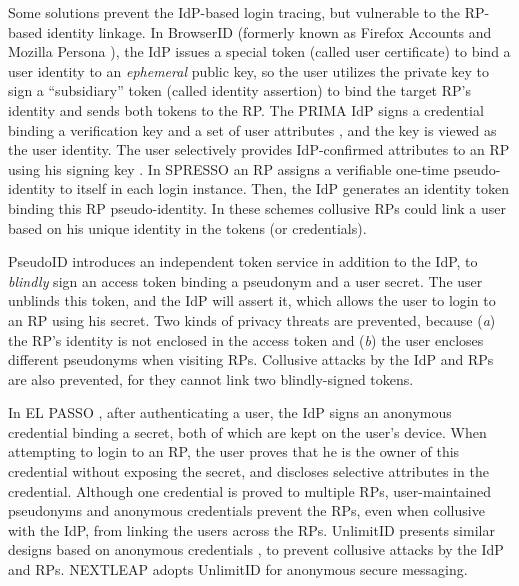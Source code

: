 Some solutions prevent the IdP-based login tracing,
    but vulnerable to the RP-based identity linkage.
In BrowserID \cite{BrowserID} (formerly known as Firefox Accounts \cite{FirefoxAccount} and Mozilla Persona \cite{persona}),
 the IdP %
  issues a special token (called user certificate) to bind a user identity to an \emph{ephemeral} public key,
 so the user utilizes the private key to sign a ``subsidiary'' token (called identity assertion)
    to bind the target RP's identity and sends both tokens to the RP.
The PRIMA IdP signs a credential binding a verification key and a set of user attributes \cite{prima}, and the key is viewed as the user identity.
The user selectively provides IdP-confirmed attributes to an RP using his signing key \cite{Oblivion}. %
In SPRESSO \cite{SPRESSO} an RP assigns a verifiable one-time pseudo-identity to itself in each login instance.
Then, the IdP generates an identity token binding this RP pseudo-identity. %
In these schemes \cite{BrowserID,prima,SPRESSO}
    collusive RPs could link a user based on his unique identity in the tokens (or credentials).

PseudoID \cite{PseudoID} introduces an independent token service in addition to the IdP,
    to  \emph{blindly} sign an access token binding a pseudonym and a user secret.
The user unblinds this token,
 and the IdP will assert it,
    which allows the user to login to an RP using his secret.
Two kinds of privacy threats are prevented, because (\emph{a}) the RP's identity is not enclosed in the access token
    and (\emph{b}) the user encloses different pseudonyms when visiting RPs.
Collusive attacks by the IdP and RPs are also prevented,
    for they cannot link two blindly-signed tokens.




In EL PASSO \cite{ELPASSO}, after authenticating a user,
    the IdP signs an anonymous credential \cite{anon-credential} binding a secret,
         both of which are kept on the user's device.
When attempting to login to an RP,
    the user proves that he is the owner of this credential without exposing the secret,
        and discloses selective attributes in the credential.
Although one credential is proved to multiple RPs,
        user-maintained pseudonyms and anonymous credentials prevent the RPs, even when collusive with the IdP, from linking the users across the RPs.
UnlimitID \cite{UnlimitID} presents similar designs based on anonymous credentials \cite{anon-credential},
        to prevent collusive attacks by the IdP and RPs.
NEXTLEAP \cite{nextleap} adopts UnlimitID for anonymous secure messaging.

